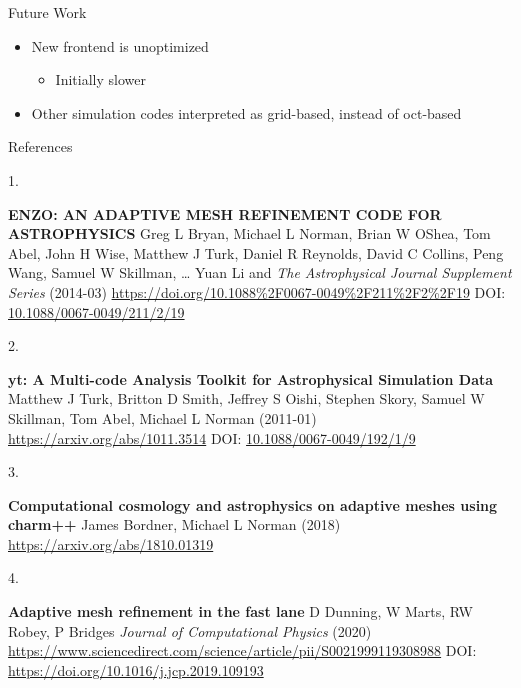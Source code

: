 \documentclass[
  ignorenonframetext,
]{beamer}
\providecommand{\tightlist}{%
  \setlength{\itemsep}{0pt}\setlength{\parskip}{0pt}}
\newlength{\cslhangindent}
\newlength{\csllabelwidth}
\newlength{\cslentryspacingunit} %
\newenvironment{CSLReferences}[2] %
 {%
  \setlength{\parindent}{0pt}
  \ifodd #1
  \let\oldpar\par
  \def\par{\hangindent=\cslhangindent\oldpar}
  \fi
  \setlength{\parskip}{#2\cslentryspacingunit}
 }%
 {}
\newcommand{\CSLBlock}[1]{#1\hfill\break}
\newcommand{\CSLLeftMargin}[1]{\parbox[t]{\csllabelwidth}{#1}}
\newcommand{\CSLRightInline}[1]{\parbox[t]{\linewidth - \csllabelwidth}{#1}\break}
\begin{document}
\begin{frame}{Future Work}
\protect\hypertarget{future-work}{}
\begin{itemize}
\tightlist
\item
  New frontend is unoptimized

  \begin{itemize}
  \tightlist
  \item
    Initially slower
  \end{itemize}
\item
  Other simulation codes interpreted as grid-based, instead of oct-based
\end{itemize}
\end{frame}

\begin{frame}[allowframebreaks]{References}
\protect\hypertarget{references}{}
\hypertarget{refs}{}
\begin{CSLReferences}{0}{0}
\leavevmode{}%
\CSLLeftMargin{1. }%
\CSLRightInline{\textbf{{ENZO}: {AN} {ADAPTIVE} {MESH} {REFINEMENT}
{CODE} {FOR} {ASTROPHYSICS}}
\CSLBlock{Greg L Bryan, Michael L Norman, Brian W OShea, Tom Abel, John
H Wise, Matthew J Turk, Daniel R Reynolds, David C Collins, Peng Wang,
Samuel W Skillman, \ldots{} Yuan Li and} \emph{The Astrophysical Journal
Supplement Series} (2014-03)
\url{https://doi.org/10.1088\%2F0067-0049\%2F211\%2F2\%2F19}
\CSLBlock{DOI:
\href{https://doi.org/10.1088/0067-0049/211/2/19}{10.1088/0067-0049/211/2/19}}}

\leavevmode{}%
\CSLLeftMargin{2. }%
\CSLRightInline{\textbf{{yt: A Multi-code Analysis Toolkit for
Astrophysical Simulation Data}}
\CSLBlock{Matthew J Turk, Britton D Smith, Jeffrey S Oishi, Stephen
Skory, Samuel W Skillman, Tom Abel, Michael L Norman} (2011-01)
\url{https://arxiv.org/abs/1011.3514}
\CSLBlock{DOI:
\href{https://doi.org/10.1088/0067-0049/192/1/9}{10.1088/0067-0049/192/1/9}}}

\leavevmode{}%
\CSLLeftMargin{3. }%
\CSLRightInline{\textbf{Computational cosmology and astrophysics on
adaptive meshes using charm++}
\CSLBlock{James Bordner, Michael L Norman} (2018)
\url{https://arxiv.org/abs/1810.01319}}

\leavevmode{}%
\CSLLeftMargin{4. }%
\CSLRightInline{\textbf{Adaptive mesh refinement in the fast lane}
\CSLBlock{D Dunning, W Marts, RW Robey, P Bridges} \emph{Journal of
Computational Physics} (2020)
\url{https://www.sciencedirect.com/science/article/pii/S0021999119308988}
\CSLBlock{DOI: \url{https://doi.org/10.1016/j.jcp.2019.109193}}}

\end{CSLReferences}
\end{frame}
\end{document}
